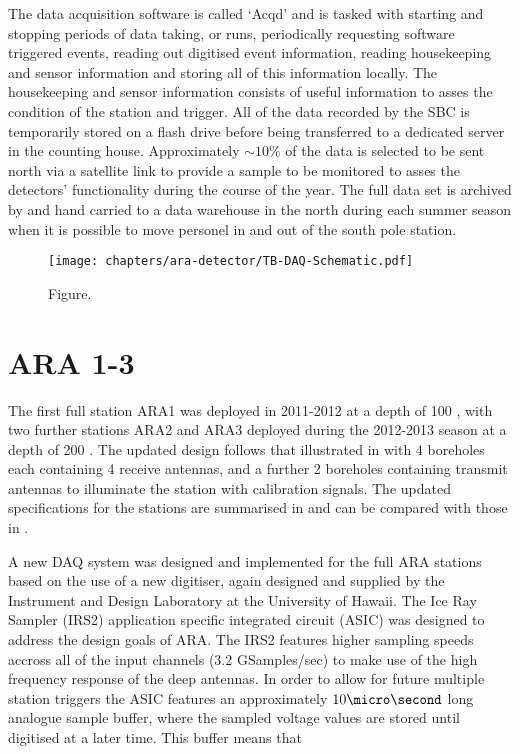 The data acquisition software is called `Acqd' and is tasked with starting and stopping  periods of data taking, or runs, periodically requesting software triggered events, reading out digitised event information, reading housekeeping and sensor information and storing all of this information locally. The housekeeping and sensor information consists of useful information to asses the condition of the station and trigger. All of the data recorded by the SBC is temporarily stored on a flash drive before being transferred to a dedicated server in the counting house. Approximately $\sim 10 \%$ of the data is selected to be sent north via a satellite link to provide a sample to be monitored to asses the detectors' functionality during the course of the year. The full data set is archived by and hand carried to a data warehouse in the north during each summer season when it is possible to move personel in and out of the south pole station. 


\begin{figure}[htpb]
  \centering
  \texttt{[image: chapters/ara-detector/TB-DAQ-Schematic.pdf]}
  \caption{Figure.}
  \label{fig:ara-detector:TestBed:DAQ-Schematic}
\end{figure}

\section{ARA 1-3}
\label{sec:ara-detector:ARA1-3}

The first full station ARA1 was deployed in 2011-2012 at a depth of 100 \meter, with two further stations ARA2 and ARA3 deployed during the 2012-2013 season at a depth of 200 \meter. The updated design follows that illustrated in  with 4 boreholes each containing 4 receive antennas, and a further 2 boreholes containing transmit antennas to illuminate the station with calibration signals. The updated specifications for the stations are summarised in  and can be compared with those in .

A new DAQ system was designed and implemented for the full ARA stations based on the use of a new digitiser, again designed and supplied by the Instrument and Design Laboratory at the University of Hawaii. The Ice Ray Sampler (IRS2) application specific integrated circuit (ASIC) was designed to address the design goals of ARA. The IRS2 features higher sampling speeds accross all of the input channels (3.2 GSamples/sec) to make use of the high frequency response of the deep antennas. In order to allow for future multiple station triggers the ASIC features an approximately $10 \micro \second$ long analogue sample buffer, where the sampled voltage values are stored until digitised at a later time. This buffer means that 

